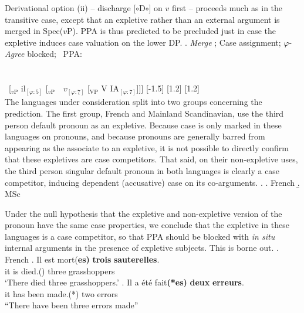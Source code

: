 \documentclass[11pt, letterpaper]{paper_nick}
\newcommand{\fm}[1]{[$\circ$#1$\circ$]}
\begin{document}
Derivational option (ii) -- discharge \fm{D} on $v$ first -- proceeds much as in the transitive case, except that an expletive rather than an external argument is merged in Spec($v$P). PPA is thus predicted to be precluded just in case the expletive induces case valuation on the lower DP. 
\ex. \emph{Merge} ; Case assignment; $\varphi$-\emph{Agree} blocked; \xmark\ PPA:\\\\\\
\ [$_\text{$v$P}$ \hspace*{-.3cm}il$_{[\varphi:5]}$ [$_\text{$v$P}$\ \ \hspace*{-.2cm}\hspace*{-.2cm}$v_{[\varphi:\underline{7}]}$ [$_\text{VP}$ V \hspace*{-.3cm}IA$_{[\varphi:7]}$]]]
[-1.5]
[1.2]
[1.2]\\

The languages under consideration split into two groups concerning the prediction. The first group, French and Mainland Scandinavian, use the third person default pronoun as an expletive. Because case is only marked in these languages on pronouns, and because pronouns are generally barred from appearing as the associate to an expletive, it is not possible to directly confirm that these expletives are case competitors. That said, on their non-expletive uses, the third person singular default pronoun in both languages is clearly a case competitor, inducing dependent (accusative) case on its co-arguments. 
\ex. 
\a. French
\b. MSc

Under the null hypothesis that the expletive and non-expletive version of the pronoun have the same case properties, we conclude that the expletive in these languages is a case competitor, so that PPA should be blocked with \emph{in situ} internal arguments in the presence of expletive subjects. This is borne out. 
\ex. French
\ag. Il est mort{(\bf *es)} {\bf trois} {\bf sauterelles}.\\
it is died.() three grasshoppers\\
`There died three grasshoppers.'
\bg. Il a \'et\'e fait{\bf (*es)} {\bf deux} {\bf erreurs}.\\
it has been made.(*) two errors\\
``There have been three errors made''
\end{document}
